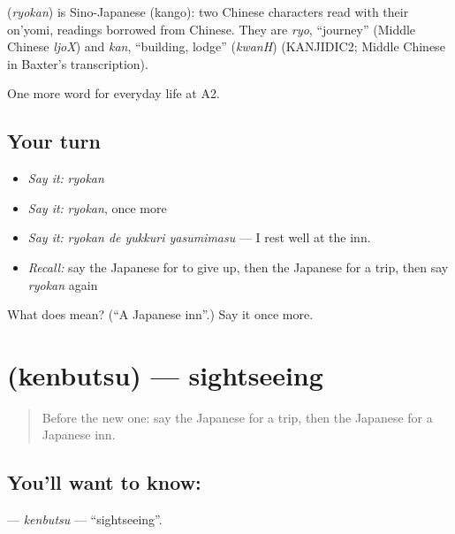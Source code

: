 \begin{cousinweb}
\textbf{} (\emph{ryokan}) is Sino-Japanese (kango): two Chinese characters read with their on'yomi, readings borrowed from Chinese. They are \emph{ryo}, \textquotedblleft{}journey\textquotedblright{} (Middle Chinese \emph{ljoX}) and \emph{kan}, \textquotedblleft{}building, lodge\textquotedblright{} (\emph{kwanH}) (KANJIDIC2; Middle Chinese in Baxter's transcription).
\end{cousinweb}

\begin{grammarlens}[title={What you've built}]
One more word for everyday life at A2.
\end{grammarlens}

\subsection*{Your turn}
\begin{itemize}
\raggedright
  \item \emph{Say it:} \emph{ryokan}
  \item \emph{Say it:} \emph{ryokan}, once more
  \item \emph{Say it:} \emph{ryokan de yukkuri yasumimasu} — I rest well at the inn.
  \item \emph{Recall:} say the Japanese for to give up, then the Japanese for a trip, then say \emph{ryokan} again
\end{itemize}

\begin{tcolorbox}[breakable,colback=teal!4,colframe=teal!35!black,title={Before you move on}]
What does  mean? (\textquotedblleft{}A Japanese inn\textquotedblright{}.) Say it once more.
\end{tcolorbox}
\section[\texorpdfstring{\ja{けんぶつ} (kenbutsu)}{けんぶつ (kenbutsu)}]{ (kenbutsu) — sightseeing}

\label{lesson:JA-C204-kenbutsu}



\begin{quote}
Before the new one: say the Japanese for a trip, then the Japanese for a Japanese inn.
\end{quote}

\subsection*{You'll want to know: }
\textbf{} — \emph{kenbutsu} — \textquotedblleft{}sightseeing\textquotedblright{}.

